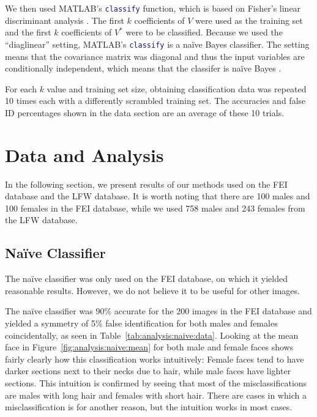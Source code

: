 \documentclass[hidelinks,11pt]{article}
\begin{document}
We then used MATLAB's \lstinline[language=Matlab]!classify! function, which is
based on Fisher's linear discriminant analysis \cite{classify}. The first $k$
coefficients of $V$ were used as the training set and the first $k$ coefficients
of $V^*$ were to be classified. Because we used the ``diaglinear'' setting,
MATLAB's \lstinline[language=Matlab]!classify! is a na\"ive Bayes classifier.
The setting means that the covariance matrix was diagonal and thus the input
variables are conditionally independent, which means that the classifer is
na\"ive Bayes \cite{nbayes}.

For each $k$ value and training set size, obtaining classification data was
repeated 10 times each with a differently scrambled training set. The accuracies
and false ID percentages shown in the data section are an average of these 10
trials.

\pagebreak
\section{Data and Analysis}
\label{sec:analysis}

In the following section, we present results of our methods used on the FEI
database and the LFW database. It is worth noting that there are 100 males and
100 females in the FEI database, while we used 758 males and 243 females from
the LFW database.

\subsection{Na\"ive Classifier}
\label{sec:analysis:naive}

The na\"ive classifier was only used on the FEI database, on which it yielded
reasonable results. However, we do not believe it to be useful for other images.

The na\"ive classifier was 90\% accurate for the 200 images in the FEI database
and yielded a symmetry of 5\% false identification for both males and females
coincidentally, as seen in Table~\ref{tab:analysis:naive:data}. Looking at the
mean face in Figure~\ref{fig:analysis:naive:mean} for both
male and female faces shows fairly clearly how this classification works
intuitively: Female faces tend to have darker sections next to their necks due to
hair, while male faces have lighter sections. This intuition is confirmed by
seeing that most of the misclassifications are males with long hair and females
with short hair. There are cases in which a misclassification is for another
reason, but the intuition works in most cases.
\end{document}
